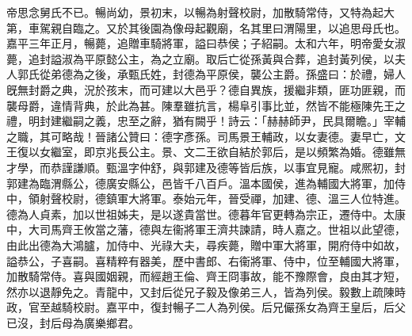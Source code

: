 \begin{pinyinscope}
帝思念舅氏不已。暢尚幼，景初末，以暢為射聲校尉，加散騎常侍，又特為起大第，車駕親自臨之。又於其後園為像母起觀廟，名其里曰渭陽里，以追思母氏也。嘉平三年正月，暢薨，追贈車騎將軍，謚曰恭侯；子紹嗣。太和六年，明帝愛女淑薨，追封謚淑為平原懿公主，為之立廟。取后亡從孫黃與合葬，追封黃列侯，以夫人郭氏從弟德為之後，承甄氏姓，封德為平原侯，襲公主爵。孫盛曰：於禮，婦人旣無封爵之典，況於孩末，而可建以大邑乎？德自異族，援繼非類，匪功匪親，而襲母爵，違情背典，於此為甚。陳羣雖抗言，楊阜引事比並，然皆不能極陳先王之禮，明封建繼嗣之義，忠至之辭，猶有闕乎！詩云：「赫赫師尹，民具爾瞻。」宰輔之職，其可略哉！晉諸公贊曰：德字彥孫。司馬景王輔政，以女妻德。妻早亡，文王復以女繼室，即京兆長公主。景、文二王欲自結於郭后，是以頻繁為婚。德雖無才學，而恭謹謙順。甄溫字仲舒，與郭建及德等皆后族，以事宜見寵。咸熈初，封郭建為臨渭縣公，德廣安縣公，邑皆千八百戶。溫本國侯，進為輔國大將軍，加侍中，領射聲校尉，德鎮軍大將軍。泰始元年，晉受禪，加建、德、溫三人位特進。德為人貞素，加以世祖姊夫，是以遂貴當世。德暮年官更轉為宗正，遷侍中。太康中，大司馬齊王攸當之藩，德與左衞將軍王濟共諫請，時人嘉之。世祖以此望德，由此出德為大鴻臚，加侍中、光祿大夫，尋疾薨，贈中軍大將軍，開府侍中如故，謚恭公，子喜嗣。喜精粹有器美，歷中書郎、右衞將軍、侍中，位至輔國大將軍，加散騎常侍。喜與國姻親，而經趙王倫、齊王冏事故，能不豫際會，良由其才短，然亦以退靜免之。青龍中，又封后從兄子毅及像弟三人，皆為列侯。毅數上疏陳時政，官至越騎校尉。嘉平中，復封暢子二人為列侯。后兄儼孫女為齊王皇后，后父已沒，封后母為廣樂鄉君。


\end{pinyinscope}